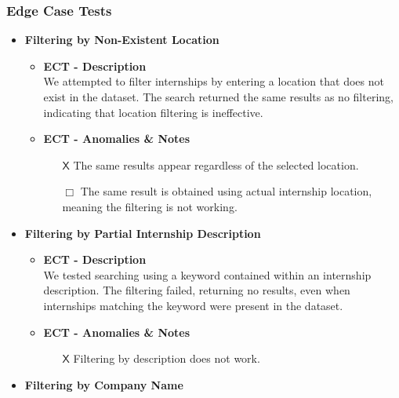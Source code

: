\subsubsection{Edge Case Tests}
\begin{itemize} [label= {\color{titleColor}\(\diamond\)}]
    \item \textbf{\color{titleColor} Filtering by Non-Existent Location}
    \begin{itemize}
        \item \textbf{\color{titleColor} ECT - Description}\\
        We attempted to filter internships by entering a location that does not exist in the dataset. The search returned the same results as no filtering, indicating that location filtering is ineffective.
        \item \textbf{\color{titleColor} ECT - Anomalies \& Notes}\\
        \begin{itemize}
            \item [{\color{titleColor}\(\mathsf{X}\)}]  The same results appear regardless of the selected location.
            \item [{\color{titleColor}\(\Box \)}] The same result is obtained using actual internship location, meaning the filtering is not working.
        \end{itemize} 
    \end{itemize}
    \item \textbf{\color{titleColor} Filtering by Partial Internship Description}
    \begin{itemize}
        \item \textbf{\color{titleColor} ECT - Description}\\
        We tested searching using a keyword contained within an internship description. The filtering failed, returning no results, even when internships matching the keyword were present in the dataset.
        \item \textbf{\color{titleColor} ECT - Anomalies \& Notes}
        \begin{itemize}
            \item [{\color{titleColor}\(\mathsf{X}\)}] Filtering by description does not work.
        \end{itemize} 
    \end{itemize}
    \item \textbf{\color{titleColor} Filtering by Company Name}
    \begin{itemize}

\end{itemize}
\end{itemize}
